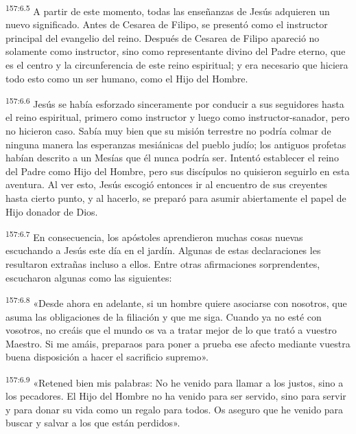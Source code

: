 \par 
\textsuperscript{157:6.5} A partir de este momento, todas las enseñanzas de Jesús adquieren un nuevo significado. Antes de Cesarea de Filipo, se presentó como el instructor principal del evangelio del reino. Después de Cesarea de Filipo apareció no solamente como instructor, sino como representante divino del Padre eterno, que es el centro y la circunferencia de este reino espiritual; y era necesario que hiciera todo esto como un ser humano, como el Hijo del Hombre.

\par 
\textsuperscript{157:6.6} Jesús se había esforzado sinceramente por conducir a sus seguidores hasta el reino espiritual, primero como instructor y luego como instructor-sanador, pero no hicieron caso. Sabía muy bien que su misión terrestre no podría colmar de ninguna manera las esperanzas mesiánicas del pueblo judío; los antiguos profetas habían descrito a un Mesías que él nunca podría ser. Intentó establecer el reino del Padre como Hijo del Hombre, pero sus discípulos no quisieron seguirlo en esta aventura. Al ver esto, Jesús escogió entonces ir al encuentro de sus creyentes hasta cierto punto, y al hacerlo, se preparó para asumir abiertamente el papel de Hijo donador de Dios.

\par 
\textsuperscript{157:6.7} En consecuencia, los apóstoles aprendieron muchas cosas nuevas escuchando a Jesús este día en el jardín. Algunas de estas declaraciones les resultaron extrañas incluso a ellos. Entre otras afirmaciones sorprendentes, escucharon algunas como las siguientes:

\par 
\textsuperscript{157:6.8} «Desde ahora en adelante, si un hombre quiere asociarse con nosotros, que asuma las obligaciones de la filiación y que me siga. Cuando ya no esté con vosotros, no creáis que el mundo os va a tratar mejor de lo que trató a vuestro Maestro. Si me amáis, preparaos para poner a prueba ese afecto mediante vuestra buena disposición a hacer el sacrificio supremo».

\par 
\textsuperscript{157:6.9} «Retened bien mis palabras: No he venido para llamar a los justos, sino a los pecadores. El Hijo del Hombre no ha venido para ser servido, sino para servir y para donar su vida como un regalo para todos. Os aseguro que he venido para buscar y salvar a los que están perdidos».

